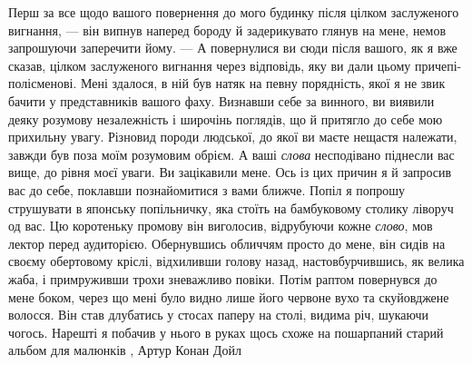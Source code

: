 Перш за все щодо вашого повернення до мого будинку після цілком заслуженого
вигнання, — він випнув наперед бороду й задерикувато глянув на мене, немов
запрошуючи заперечити йому. — А повернулися ви сюди після вашого, як я вже
сказав, цілком заслуженого вигнання через відповідь, яку ви дали цьому
причепі-полісменові. Мені здалося, в ній був натяк на певну порядність, якої я
не звик бачити у представників вашого фаху. Визнавши себе за винного, ви
виявили деяку розумову незалежність і широчінь поглядів, що й притягло до себе
мою прихильну увагу. Різновид породи людської, до якої ви маєте нещастя
належати, завжди був поза моїм розумовим обрієм. А ваші \emph{слова}
несподівано піднесли вас вище, до рівня моєї уваги. Ви зацікавили мене. Ось із
цих причин я й запросив вас до себе, поклавши познайомитися з вами ближче.
Попіл я попрошу струшувати в японську попільничку, яка стоїть на бамбуковому
столику ліворуч од вас.  Цю коротеньку промову він виголосив, відрубуючи кожне
\emph{слово}, мов лектор перед аудиторією. Обернувшись обличчям просто до мене,
він сидів на своєму обертовому кріслі, відхиливши голову назад,
настовбурчившись, як велика жаба, і примруживши трохи зневажливо повіки. Потім
раптом повернувся до мене боком, через що мені було видно лише його червоне
вухо та скуйовджене волосся. Він став длубатись у стосах паперу на столі,
видима річ, шукаючи чогось. Нарешті я побачив у нього в руках щось схоже на
пошарпаний старий альбом для малюнків
, Артур Конан Дойл
